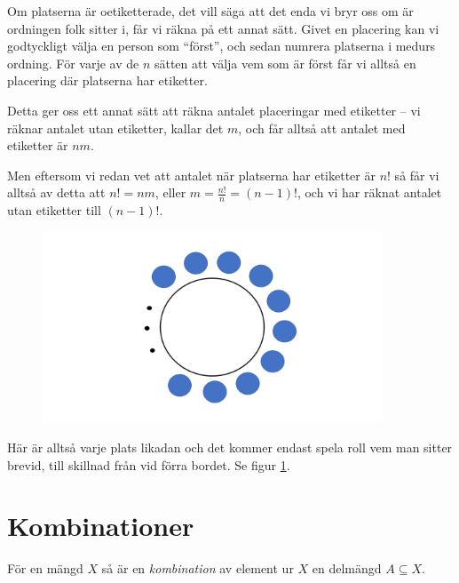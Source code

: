\documentclass{tufte-handout}
\begin{document}
\begin{example}
	Om platserna är oetiketterade, det vill säga att det enda vi bryr oss om är ordningen folk sitter i, får vi räkna på ett annat sätt. Givet en placering kan vi godtyckligt välja en person som ``först'', och sedan numrera platserna i medurs ordning. För varje av de $n$ sätten att välja vem som är först får vi alltså en placering där platserna har etiketter.

	Detta ger oss ett annat sätt att räkna antalet placeringar med etiketter -- vi räknar antalet utan etiketter, kallar det $m$, och får alltså att antalet med etiketter är $nm$.

	Men eftersom vi redan vet att antalet när platserna har etiketter är $n!$ så får vi alltså av detta att $n! = nm$, eller $m = \frac{n!}{n} = (n-1)!$, och vi har räknat antalet utan etiketter till $(n-1)!$.
 
 \begin{figure}[h] 
 \includegraphics[width=0.9\textwidth]{graphics/bordutanfarg1.png}
 \label{fig:4}
\end{figure}

       Här är alltså varje plats likadan och det kommer endast spela roll vem man sitter brevid, till skillnad från vid förra bordet. Se figur \ref{fig:4}.  
\end{example}
\section{Kombinationer}

\begin{definition}
	För en mängd $X$ så är en \emph{kombination} av element ur $X$ en delmängd $A \subseteq X$.
\end{definition}
\end{document}
